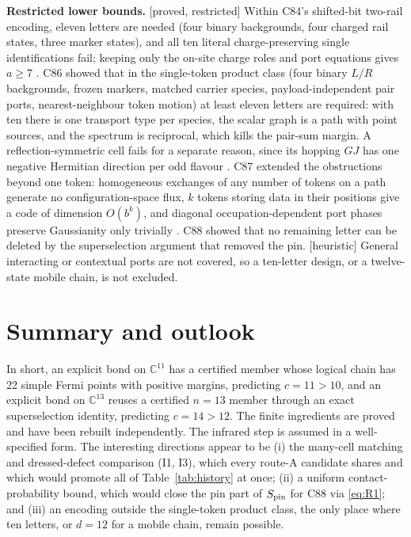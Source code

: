 \documentclass[11pt]{article}
\newcommand{\tg}[1]{\textsf{[#1]}}
\begin{document}
\textbf{Restricted lower bounds.} \tg{proved, restricted} Within C84's shifted-bit two-rail encoding, eleven letters are needed (four binary backgrounds, four charged rail states, three marker states), and all ten literal charge-preserving single identifications fail; keeping only the on-site charge roles and port equations gives $a\ge7$ \cite{C84}. C86 showed that in the single-token product class (four binary $L/R$ backgrounds, frozen markers, matched carrier species, payload-independent pair ports, nearest-neighbour token motion) at least eleven letters are required: with ten there is one transport type per species, the scalar graph is a path with point sources, and the spectrum is reciprocal, which kills the pair-sum margin. A reflection-symmetric cell fails for a separate reason, since its hopping $GJ$ has one negative Hermitian direction per odd flavour \cite{C86}. C87 extended the obstructions beyond one token: homogeneous exchanges of any number of tokens on a path generate no configuration-space flux, $k$ tokens storing data in their positions give a code of dimension $O(b^k)$, and diagonal occupation-dependent port phases preserve Gaussianity only trivially \cite{C87}. C88 showed that no remaining letter can be deleted by the superselection argument that removed the pin. \tg{heuristic} General interacting or contextual ports are not covered, so a ten-letter design, or a twelve-state mobile chain, is not excluded.

\section{Summary and outlook}

In short, an explicit bond on $\mathbb{C}^{11}$ has a certified member whose logical chain has 22 simple Fermi points with positive margins, predicting $c=11>10$, and an explicit bond on $\mathbb{C}^{13}$ reuses a certified $n=13$ member through an exact superselection identity, predicting $c=14>12$. The finite ingredients are proved and have been rebuilt independently. The infrared step is assumed in a well-specified form. The interesting directions appear to be (i) the many-cell matching and dressed-defect comparison (I1, I3), which every route-A candidate shares and which would promote all of Table~\ref{tab:history} at once; (ii) a uniform contact-probability bound, which would close the pin part of $S_{\rm pin}$ for C88 via \eqref{eq:R1}; and (iii) an encoding outside the single-token product class, the only place where ten letters, or $d=12$ for a mobile chain, remain possible.
\end{document}
